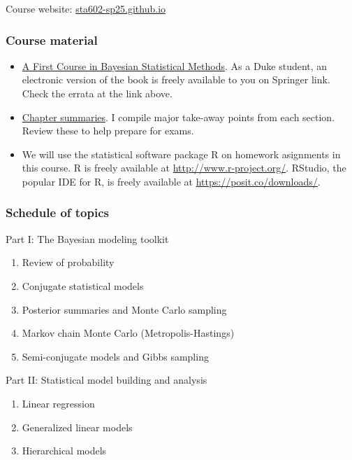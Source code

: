 \documentclass[
  letterpaper,
  DIV=11,
  numbers=noendperiod]{scrartcl}
\providecommand{\tightlist}{%
  \setlength{\itemsep}{0pt}\setlength{\parskip}{0pt}}\usepackage{longtable,booktabs,array}
\begin{document}
Course website:
\href{https://sta602-sp25.github.io/}{sta602-sp25.github.io}

\hypertarget{course-material}{%
\subsubsection{Course material}\label{course-material}}

\begin{itemize}
\item
  \href{https://pdhoff.github.io/book/}{A First Course in Bayesian
  Statistical Methods}. As a Duke student, an electronic version of the
  book is freely available to you on Springer link. Check the errata at
  the link above.
\item
  \href{/chapterSummaries.html}{Chapter summaries}. I compile major
  take-away points from each section. Review these to help prepare for
  exams.
\item
  We will use the statistical software package R on homework asignments
  in this course. R is freely available at
  \url{http://www.r-project.org/}. RStudio, the popular IDE for R, is
  freely available at \url{https://posit.co/downloads/}.
\end{itemize}

\hypertarget{schedule-of-topics}{%
\subsubsection{Schedule of topics}\label{schedule-of-topics}}

Part I: The Bayesian modeling toolkit

\begin{enumerate}
\def\labelenumi{\arabic{enumi}.}
\tightlist
\item
  Review of probability
\item
  Conjugate statistical models
\item
  Posterior summaries and Monte Carlo sampling
\item
  Markov chain Monte Carlo (Metropolis-Hastings)
\item
  Semi-conjugate models and Gibbs sampling
\end{enumerate}

Part II: Statistical model building and analysis

\begin{enumerate}
\def\labelenumi{\arabic{enumi}.}
\tightlist
\item
  Linear regression
\item
  Generalized linear models
\item
  Hierarchical models
\end{enumerate}
\end{document}

